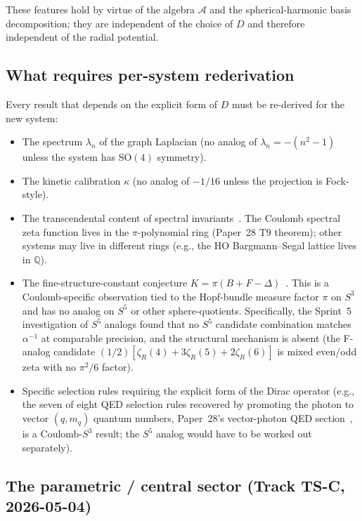 \documentclass[twocolumn,pra,amsmath,amssymb,superscriptaddress]{revtex4-2}
\begin{document}
These features hold by virtue of the algebra $\mathcal{A}$ and the
spherical-harmonic basis decomposition; they are independent of the
choice of $D$ and therefore independent of the radial potential.

\subsection{What requires per-system rederivation}

Every result that depends on the explicit form of $D$ must be
re-derived for the new system:

\begin{itemize}
\item The spectrum $\lambda_n$ of the graph Laplacian (no analog of
  $\lambda_n = -(n^2 - 1)$ unless the system has $\mathrm{SO}(4)$
  symmetry).
\item The kinetic calibration $\kappa$ (no analog of $-1/16$
  unless the projection is Fock-style).
\item The transcendental content of spectral
  invariants~\cite{paper18,paper28}.  The Coulomb spectral zeta
  function lives in the $\pi$-polynomial ring (Paper~28 T9
  theorem); other systems may live in different rings (e.g., the HO
  Bargmann--Segal lattice lives in $\mathbb{Q}$).
\item The fine-structure-constant conjecture
  $K = \pi(B + F - \Delta)$~\cite{paper2_alpha}.  This is a
  Coulomb-specific observation tied to the Hopf-bundle measure
  factor $\pi$ on $S^3$ and has no analog on $S^5$ or other
  sphere-quotients.  Specifically, the Sprint~5 investigation of
  $S^5$ analogs found that no $S^5$ candidate combination matches
  $\alpha^{-1}$ at comparable precision, and the structural mechanism
  is absent (the F-analog candidate
  $(1/2)[\zeta_R(4) + 3\zeta_R(5) + 2\zeta_R(6)]$ is mixed even/odd
  zeta with no $\pi^2/6$ factor).
\item Specific selection rules requiring the explicit form of
  the Dirac operator (e.g., the seven of eight QED selection rules
  recovered by promoting the photon to vector $(q, m_q)$ quantum
  numbers, Paper~28's vector-photon QED
  section~\cite{paper28}, is a Coulomb-$S^3$ result; the $S^5$
  analog would have to be worked out separately).
\end{itemize}

\subsection{The parametric / central sector (Track TS-C, 2026-05-04)}
\label{sec:parametric_central_sector}
\end{document}
